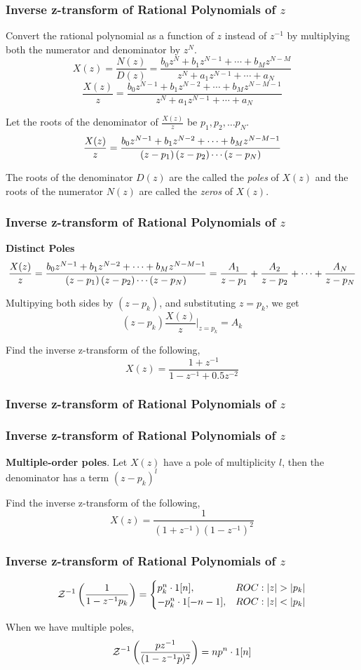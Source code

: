 \documentclass[aspectratio=169]{beamer}
\def\mc{\ensuremath\mathcal}
\def\lp{\ensuremath\left(}
\def\rp{\ensuremath\right)}
\begin{document}
\begin{frame}[t]
  \frametitle{Inverse z-transform of Rational Polynomials of $z$}
  Convert the rational polynomial as a function of $z$ instead of $z^{-1}$ by multiplying both the numerator and denominator by $z^{N}$.
  \[ X(z) = \frac{N(z)}{D(z)} = \frac{b_0z^N + b_1 z^{N-1} + \cdots + b_Mz^{N-M}}{z^N + a_1z^{N-1} + \cdots + a_N} \]
  \[ \frac{X(z)}{z} = \frac{b_0z^{N-1} + b_1 z^{N-2} + \cdots + b_Mz^{N-M-1}}{z^N + a_1z^{N-1} + \cdots + a_N} \]

  Let the roots of the denominator of $\frac{X(z)}{z}$ be $p_1, p_2, \ldots p_N$.
  \[ \frac{X(z)}{z} = \frac{b_0z^{N-1} + b_1 z^{N-2} + \cdots + b_Mz^{N-M-1}}{\lp z - p_1\rp \lp z - p_2\rp \cdots \lp z - p_N\rp} \]

  The roots of the denominator $D(z)$ are the called the \textit{poles} of $X(z)$ and the roots of the numerator $N(z)$ are called the \textit{zeros} of $X(z)$.
\end{frame}


\begin{frame}[t]
  \frametitle{Inverse z-transform of Rational Polynomials of $z$}
  \textbf{Distinct Poles}
  \[ \frac{X(z)}{z} = \frac{b_0z^{N-1} + b_1 z^{N-2} + \cdots + b_Mz^{N-M-1}}{\lp z - p_1\rp \lp z - p_2\rp \cdots \lp z - p_N\rp} = \frac{A_1}{z - p_1} + \frac{A_2}{z - p_2} + \cdots + \frac{A_N}{z - p_N} \]

  Multipying both sides by $(z - p_k)$, and substituting $z = p_k$, we get
  \[ (z - p_k)\frac{X(z)}{z} \bigg\vert_{z = p_k} = A_k \]

  Find the inverse z-transform of the following,
  \[ X(z)  =\frac{1 + z^{-1}}{1 - z^{-1} + 0.5z^{-2}}\]
\end{frame}


\begin{frame}[t]
  \frametitle{Inverse z-transform of Rational Polynomials of $z$}  
\end{frame}


\begin{frame}[t]
  \frametitle{Inverse z-transform of Rational Polynomials of $z$}
  \textbf{Multiple-order poles}. Let $X(z)$ have a pole of multiplicity $l$, then the denominator has a term $(z - p_k)^l$

  Find the inverse z-transform of the following,
  \[ X(z)  =\frac{1}{(1 + z^{-1})(1 - z^{-1})^2} \]
\end{frame}


\begin{frame}[t]
  \frametitle{Inverse z-transform of Rational Polynomials of $z$}
  \[ \mc{Z}^{-1} \lp \frac{1}{1 - z^{-1}p_k} \rp = \begin{cases}
  p_k^n \cdot 1[n], & ROC: \vert z \vert > \vert p_k \vert \\ 
  -p_k^n \cdot 1[-n-1], & ROC: \vert z \vert < \vert p_k \vert \\ 
  \end{cases} \]  

  When we have multiple poles,
  \[ \mc{Z}^{-1} \lp \frac{pz^{-1}}{(1 - z^{-1}p)^2} \rp = np^n\cdot 1[n] \]  
\end{frame}
\end{document}
